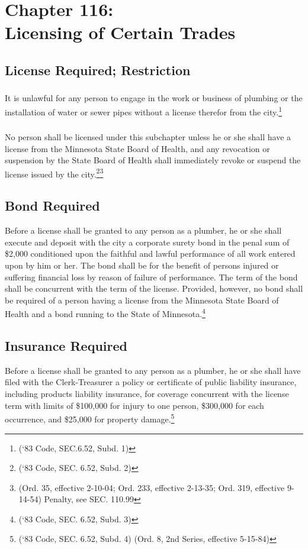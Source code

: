 \chapter*{Chapter 116: \\
	Licensing of Certain Trades}
    \vfill
    \minitoc
    \pagebreak


\section{License Required; Restriction}
\subsection{}
It is unlawful for any person to engage in the work or business of plumbing or the installation of water or sewer pipes without a license therefor from the city.\footnote{(‘83 Code, SEC.6.52, Subd. 1)}
\subsection{}
No person shall be licensed under this subchapter unless he or she shall have a license from the Minnesota State Board of Health, and any revocation or suspension by the State Board of Health shall immediately revoke or suspend the license issued by the city.\footnote{(‘83 Code, SEC. 6.52, Subd. 2)}\footnote{(Ord. 35, effective 2-10-04; Ord. 233, effective 2-13-35; Ord. 319, effective 9-14-54)  Penalty, see SEC. 110.99}
\section{Bond Required}
Before a license shall be granted to any person as a plumber, he or she shall execute and deposit with the city a corporate surety bond in the penal sum of \$2,000 conditioned upon the faithful and lawful performance of all work entered upon by him or her. The bond shall be for the benefit of persons injured or suffering financial loss by reason of failure of performance. The term of the bond shall be concurrent with the term of the license. Provided, however, no bond shall be required of a person having a license from the Minnesota State Board of Health and a bond running to the State of Minnesota.\footnote{(‘83 Code, SEC. 6.52, Subd. 3)}
\section{Insurance Required}
Before a license shall be granted to any person as a plumber, he or she shall have filed with the Clerk-Treasurer a policy or certificate of public liability insurance, including products liability insurance, for coverage concurrent with the license term with limits of \$100,000 for injury to one person, \$300,000 for each occurrence, and \$25,000 for property damage.\footnote{(‘83 Code, SEC. 6.52, Subd. 4)  (Ord. 8, 2nd Series, effective 5-15-84)}

